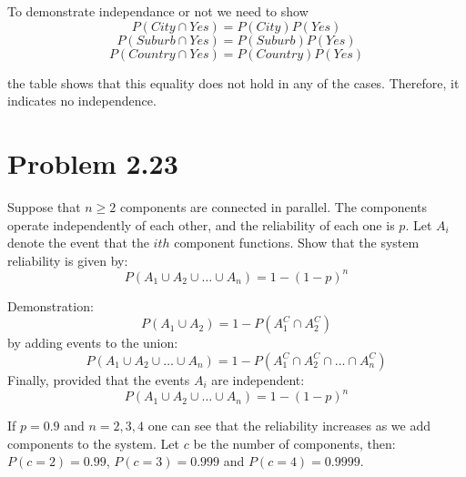 \documentclass[10pt]{article}
\begin{document}
To demonstrate independance or not we need to show 
\[
P(City \cap Yes) = P(City) P(Yes)
\]
\[
P(Suburb \cap Yes) = P(Suburb) P(Yes)
\]
\[
P(Country \cap Yes) = P(Country) P(Yes)
\]

the table shows that this equality does not hold in any of the cases. Therefore, it indicates no independence.


\section{Problem 2.23}
Suppose that $n\geq2$ components are connected in parallel. The components operate independently of each other, 
 and the reliability of each one is $p$. Let $A_i$ denote the event that the $ith$ component functions. Show that
the system reliability is given by:
    \[
        P(A_1 \cup A_2 \cup \dots \cup A_n)=1-(1-p)^n
    \]

Demonstration:
\[
P(A_1 \cup A_2) = 1 - P(A_1^C \cap A_2^C)
\]
by adding events to the union:
\[
P(A_1 \cup A_2 \cup \dots \cup A_n) = 1 - P(A_1^C \cap A_2^C \cap \dots \cap A_n^C)
\]
Finally, provided that the events $A_i$ are independent:
\[
P(A_1 \cup A_2 \cup \dots \cup A_n) = 1 - (1-p)^n
\]



If $p=0.9$ and $n=2,3,4$ one can see that the reliability increases as we add components
to the system. Let $c$ be the number of components, then: $P(c=2) = 0.99$, $P(c=3)=0.999$ and
$P(c=4)=0.9999$. 
\end{document}
